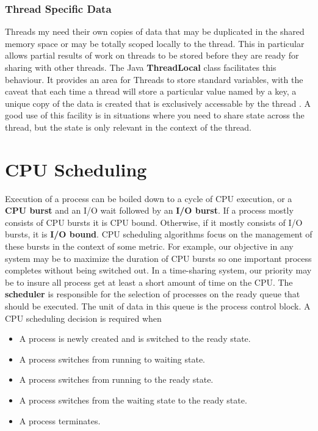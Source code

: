 \documentclass[10pt,a4paper]{article}
\begin{document}
\subsubsection{Thread Specific Data}
Threads my need their own copies of data that may be duplicated in the shared memory space or may be totally scoped locally to the thread. This in particular allows partial results of work on threads to be stored before they are ready for sharing with other threads. The Java {\bf ThreadLocal } class facilitates this behaviour. It provides an area for Threads to store standard variables, with the caveat that each time a thread will store a particular value named by a key, a unique copy of the data is created that is exclusively accessable by the thread \cite{threadlocal}. A good use of this facility is in situations where you need to share state across the thread, but the state is only relevant in the context of the thread.  
\section{CPU Scheduling}
Execution of a process can be boiled down to a cycle of CPU execution, or a {\bf CPU burst} and an I/O wait followed by an {\bf I/O burst}. If a process mostly consists of CPU bursts it is CPU bound. Otherwise, if it mostly consists of I/O bursts, it is {\bf I/O bound}. CPU scheduling algorithms focus on the management of these bursts in the context of some metric. For example, our objective in any system may be to maximize the duration of CPU bursts so one important process completes without being switched out. In a time-sharing system, our priority may be to insure all process get at least a short amount of time on the CPU. The {\bf scheduler} is responsible for the selection of processes on the ready queue that should be executed. The unit of data in this queue is the process control block. 
\newline\newline
A CPU scheduling decision is required when 
\begin{itemize}
\item A process is newly created and is switched to the ready state. 
\item A process switches from running to waiting state. 
\item A process switches from running to the ready state. 
\item A process switches from the waiting state to the ready state. 
\item A process terminates. 
\end{itemize}
\end{document}
